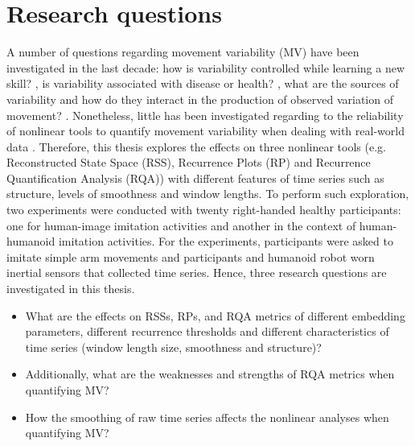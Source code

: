 \section{Research questions}
A number of questions regarding movement variability (MV) have been 
investigated in the last decade:
how is variability controlled 
while learning a new skill? \citep{wagner2012, seifert2011, bartlett2007}, 
is variability associated with disease or health? 
\citep{stergiou2006, stergiou2011}, what are the sources of variability 
and how do they interact in the production of observed variation 
of movement? \citep{preatoni2007, preatoni2010, preatoni2013}.
Nonetheless, little has been investigated regarding to the 
reliability of nonlinear tools to quantify movement 
variability \citep{iwanski1998, yao2017}
when dealing with real-world data \citep{bradley2015, caballero2014}.
Therefore, this thesis explores the effects on three nonlinear tools
(e.g. Reconstructed State Space (RSS), Recurrence Plots (RP) and 
Recurrence Quantification Analysis (RQA)) with different features 
of time series such as structure, levels of smoothness and window lengths.
To perform such exploration, two experiments were conducted with twenty 
right-handed healthy participants: one for human-image imitation 
activities and another in the context of human-humanoid imitation 
activities.
For the experiments, participants were asked to imitate simple arm movements
and participants and humanoid robot worn inertial sensors that collected 
time series.
Hence, three research questions are investigated in this thesis.

\begin{itemize}

\item What are the effects on RSSs, RPs, and RQA metrics
	of different embedding parameters, different recurrence thresholds 
	and different characteristics of time series 
	(window length size, smoothness and structure)?

\item Additionally, what are the weaknesses and strengths of 
	RQA metrics when quantifying MV?


\item How the smoothing of raw time series affects the nonlinear analyses
	when quantifying MV?

\end{itemize}




